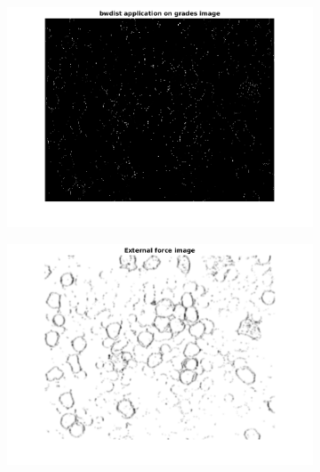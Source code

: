 \begin{figure}[htbp]
\begin{subfigure}[b]{0.4\textwidth}
        \caption{ }
        \label{fig:fig}
    \end{subfigure}
    \begin{subfigure}[b]{0.4\textwidth}
        \includegraphics[width=\textwidth]{img/final/figure3.png}
        \caption{ }
        \label{fig:fig3}
    \end{subfigure}
    \begin{subfigure}[b]{0.4\textwidth}
        \includegraphics[width=\textwidth]{img/final/figure4.png}
        \caption{ }
        \label{fig:fig4}
    \end{subfigure}
    \begin{subfigure}[b]{0.4\textwidth}

\end{subfigure}
\end{figure}
